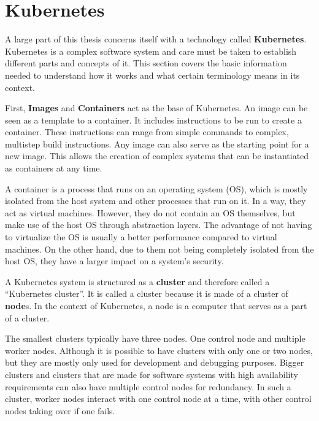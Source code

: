 \section{Kubernetes}\label{sec:kubernetes}

A large part of this thesis concerns itself with a technology called \textbf{Kubernetes}.
Kubernetes is a complex software system and care must be taken to establish different parts and concepts of it.
This section covers the basic information needed to understand how it works and what certain terminology means in its context.

First, \textbf{Images} and \textbf{Containers}\cite{docker-image,kubernetes-images,kubernetes-containers} act as the base of Kubernetes.
An image can be seen as a template to a container.
It includes instructions to be run to create a container.
These instructions can range from simple commands to complex, multistep build instructions.
Any image can also serve as the starting point for a new image.
This allows the creation of complex systems that can be instantiated as containers at any time.

A container\cite{what-are-linux-containers} is a process that runs on an operating system (OS), which is mostly isolated from the host system and other processes that run on it.
In a way, they act as virtual machines.
However, they do not contain an OS themselves, but make use of the host OS through abstraction layers.
The advantage of not having to virtualize the OS is usually a better performance compared to virtual machines.
On the other hand, due to them not being completely isolated from the host OS, they have a larger impact on a system's security.

A Kubernetes system is structured as a \textbf{cluster} and therefore called a ``Kubernetes cluster''\cite{kubernetes-cluster}.
It is called a cluster because it is made of a cluster of \textbf{node}s.
In the context of Kubernetes, a node is a computer that serves as a part of a cluster.

The smallest clusters typically have three nodes\cite{kubernetes-cluster}.
One control node and multiple worker nodes.
Although it is possible to have clusters with only one or two nodes, but they are mostly only used for development and debugging purposes\cite{minikube}.
Bigger clusters and clusters that are made for software systems with high availability requirements can also have multiple control nodes for redundancy.
In such a cluster, worker nodes interact with one control node at a time, with other control nodes taking over if one fails.


